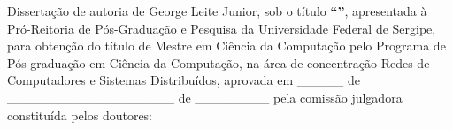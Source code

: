 \documentclass[
	12pt,				%
	oneside,			%
	a4paper,			%
	english,			%
	brazil				%
	]{abntex2ppgsi}
\begin{document}

\begin{folhadeaprovacao}
%
%
%
%
\noindent Dissertação de autoria de George Leite Junior, sob o título \textbf{``\imprimirtitulo''}, apresentada à Pró-Reitoria de Pós-Graduação e Pesquisa da Universidade Federal de Sergipe, para obtenção do título de Mestre em Ciência da Computação pelo Programa de Pós-graduação em Ciência da Computação, na área de concentração Redes de Computadores e Sistemas Distribuídos, aprovada em \_\_\_\_\_ de \_\_\_\_\_\_\_\_\_\_\_\_\_\_\_\_\_\_ de \_\_\_\_\_\_\_\_ pela comissão julgadora constituída pelos doutores:

\vspace*{3cm}


\end{folhadeaprovacao}
\end{document}
